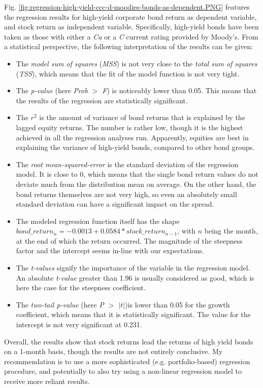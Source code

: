 Fig. \ref{fig:regression-high-yield-ccc-d-moodies-bonds-as-dependent.PNG} features the regression results for high-yield corporate bond return as dependent variable, and stock return as independent variable. Specifically, high-yield bonds have been taken as those with either a \textit{Ca} or a \textit{C} current rating provided by Moody's. From a statistical perspective, the following interpretation of the results can be given: 
\begin{itemize}
	\item The \textit{model sum of squares} (\textit{MSS}) is not very close to the \textit{total sum of squares} (\textit{TSS}), which means that the fit of the model function is not very tight. 
	\item The \textit{p-value} (here \textit{Prob $>$ F}) is noticeably lower than 0.05. This means that the results of the regression are statistically significant. 
	\item The $r^2$ is the amount of variance of bond returns that is explained by the lagged equity returns. The number is rather low, though it is the highest achieved in all the regression analyses run. Apparently, equities are best in explaining the variance of high-yield bonds, compared to other bond groups.
	\item The \textit{root mean-squared-error} is the standard deviation of the regression model. It is close to 0, which means that the single bond return values do not deviate much from the distribution mean on average. On the other hand, the bond returns themselves are not very high, so even an absolutely small standard deviation can have a significant impact on the spread. 
	\item The modeled regression function itself has the shape $bond\_return_{n} = -0.0013 + 0.0584 * stock\_return_{n-1}$, with $n$ being the month, at the end of which the return occurred. The magnitude of the steepness factor and the intercept seems in-line with our expectations. 
	\item The \textit{t-values} signify the importance of the variable in the regression model. An absolute \textit{t-value} greater than 1.96 is usually considered as good, which is here the case for the steepness coefficient.  
	\item The \textit{two-tail p-value} (here \textit{P $>$ $|t|$})is lower than 0.05 for the growth coefficient, which means that it is statistically significant. The value for the intercept is not very significant at 0.231. 
\end{itemize}
Overall, the results show that stock returns lead the returns of high yield bonds on a 1-month basis, though the results are not entirely conclusive. My recommendation is to use a more sophisticated (e.g. portfolio-based) regression procedure, and potentially to also try using a non-linear regression model to receive more reliant results. 


